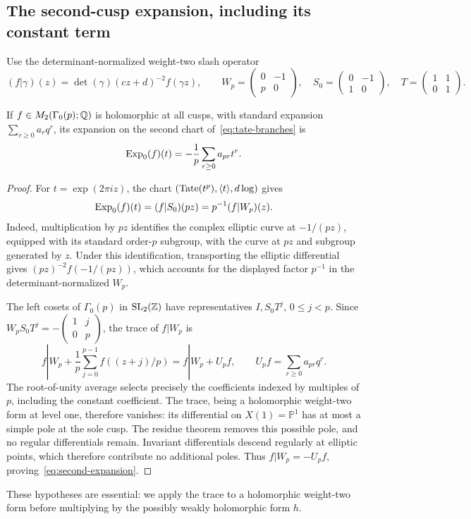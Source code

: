 \subsection{The second-cusp expansion, including its constant term}
Use the determinant-normalized weight-two slash operator
\[
 (f|\gamma)(z)=\det(\gamma)(cz+d)^{-2}f(\gamma z),
 \qquad
 W_p=\begin{pmatrix}0&-1\\p&0\end{pmatrix},\quad
 S_0=\begin{pmatrix}0&-1\\1&0\end{pmatrix},\quad
 T=\begin{pmatrix}1&1\\0&1\end{pmatrix}.
\]
\begin{lemma}\label{lem:prime-trace}
If $f\in M_2(\Gamma_0(p);\mathbb Q)$ is holomorphic at all cusps, with
standard expansion $\sum_{r\ge0}a_rq^r$, its expansion on the second
chart of~\eqref{eq:tate-branches} is
\begin{equation}\label{eq:second-expansion}
 \operatorname{Exp}_0(f)(t)=-\frac1p\sum_{r\ge0}a_{pr}t^r.
\end{equation}
\end{lemma}
\begin{proof}
For $t=\exp(2\pi iz)$, the chart
$(\operatorname{Tate}(t^p),\langle t\rangle,d\log)$ gives
\[
 \operatorname{Exp}_0(f)(t)=(f|S_0)(pz)=p^{-1}(f|W_p)(z).
\]
Indeed, multiplication by $pz$ identifies the complex elliptic curve
at $-1/(pz)$, equipped with its standard order-$p$ subgroup, with the
curve at $pz$ and subgroup generated by $z$. Under this identification,
transporting the elliptic differential gives $(pz)^{-2}f(-1/(pz))$,
which accounts for the displayed factor $p^{-1}$ in the
determinant-normalized $W_p$.

The left cosets of $\Gamma_0(p)$ in $\mathrm{SL}_2(\mathbb Z)$ have
representatives $I,S_0T^j$, $0\le j<p$. Since
$W_pS_0T^j=-\left(\begin{smallmatrix}1&j\\0&p\end{smallmatrix}\right)$,
the trace of $f|W_p$ is
\[
 f|W_p+\frac1p\sum_{j=0}^{p-1}f((z+j)/p)=f|W_p+U_pf,
 \qquad U_pf=\sum_{r\ge0}a_{pr}q^r.
\]
The root-of-unity average selects precisely the coefficients indexed
by multiples of $p$, including the constant coefficient. The trace,
being a holomorphic weight-two form at level one, therefore vanishes:
its differential on $X(1)=\mathbb P^1$ has at most a simple pole at
the sole cusp. The residue theorem removes this possible pole, and
no regular differentials remain. Invariant differentials descend regularly at
elliptic points, which therefore contribute no additional poles.
Thus $f|W_p=-U_pf$, proving~\eqref{eq:second-expansion}.
\end{proof}
These hypotheses are essential: we apply the trace to a holomorphic
weight-two form before multiplying by the possibly weakly holomorphic
form $h$.

